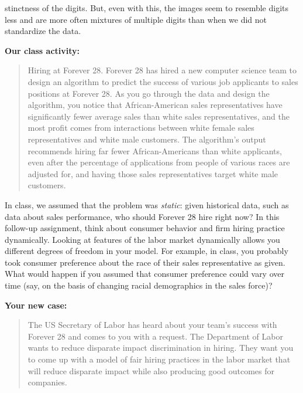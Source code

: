 \documentclass[submit]{harvardml}
\begin{document}
\begin{itemize}
stinctness of the digits. But, even with this, the images seem to resemble digits less and are more often mixtures of multiple digits than when we did not standardize the data.

\end{itemize}

\newpage
\begin{problem}
\textbf{Our class activity:}

\begin{quote}
Hiring at Forever 28. Forever 28 has hired a new computer science team
to design an algorithm to predict the success of various job
applicants to sales positions at Forever 28. As you go through the
data and design the algorithm, you notice that African-American sales
representatives have significantly fewer average sales than white
sales representatives, and the most profit comes from interactions
between white female sales representatives and white male customers.
The algorithm's output recommends hiring far fewer African-Americans
than white applicants, even after the percentage of applications from
people of various races are adjusted for, and having those sales
representatives target white male customers.
\end{quote}

In class, we assumed that the problem was \textit{static}: given
historical data, such as data about sales performance, who should
Forever 28 hire right now?  In this follow-up assignment, think
about consumer behavior and firm hiring practice dynamically. Looking
at features of the labor market dynamically allows you different
degrees of freedom in your model. For example, in class, you probably
took consumer preference about the race of their sales representative
as given. What would happen if you assumed that consumer preference
could vary over time (say, on the basis of changing racial
demographics in the sales force)?

\textbf{Your new case:}
\begin{quote}
The US Secretary of Labor has heard about your team's success with Forever 28 and comes to you with a request. The Department of Labor wants to reduce disparate impact discrimination in hiring. They want you to come up with a model of fair hiring practices in the labor market that will reduce disparate impact while also producing good outcomes for companies. 
\end{quote}


\end{problem}
\end{document}
